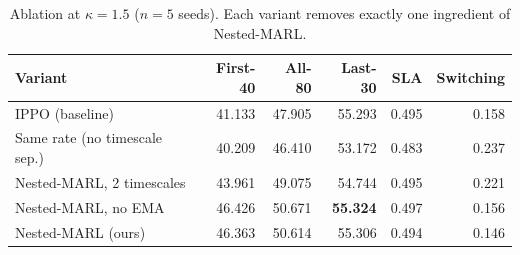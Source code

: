 \begin{table}[t]
\centering
\caption{Ablation at $\kappa=1.5$ ($n=5$ seeds). Each variant removes exactly one ingredient of Nested-MARL.}
\label{tab:ablation}
\footnotesize
\begin{tabular}{lrrrrr}
\toprule
Variant & First-40 & All-80 & Last-30 & SLA & Switching \\
\midrule
IPPO (baseline) & 41.133 & 47.905 & 55.293 & 0.495 & 0.158 \\
Same rate (no timescale sep.) & 40.209 & 46.410 & 53.172 & 0.483 & 0.237 \\
Nested-MARL, 2 timescales & 43.961 & 49.075 & 54.744 & 0.495 & 0.221 \\
Nested-MARL, no EMA & 46.426 & 50.671 & \textbf{55.324} & 0.497 & 0.156 \\
Nested-MARL (ours) & 46.363 & 50.614 & 55.306 & 0.494 & 0.146 \\
\bottomrule
\end{tabular}
\end{table}
